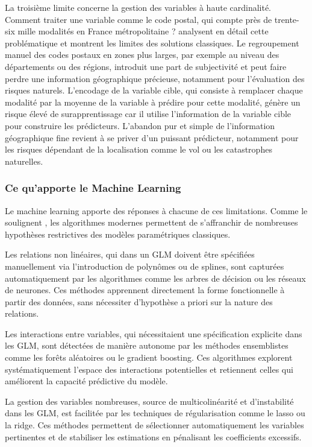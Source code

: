 \documentclass[
  french,
]{book}
\theoremstyle{definition}
\theoremstyle{definition}
\theoremstyle{definition}
\theoremstyle{definition}
\theoremstyle{remark}
\begin{document}
La troisième limite concerne la gestion des variables à haute cardinalité. Comment traiter une variable comme le code postal, qui compte près de trente-six mille modalités en France métropolitaine ? \citet{avanzi2024machine} analysent en détail cette problématique et montrent les limites des solutions classiques. Le regroupement manuel des codes postaux en zones plus larges, par exemple au niveau des départements ou des régions, introduit une part de subjectivité et peut faire perdre une information géographique précieuse, notamment pour l'évaluation des risques naturels. L'encodage de la variable cible, qui consiste à remplacer chaque modalité par la moyenne de la variable à prédire pour cette modalité, génère un risque élevé de surapprentissage car il utilise l'information de la variable cible pour construire les prédicteurs. L'abandon pur et simple de l'information géographique fine revient à se priver d'un puissant prédicteur, notamment pour les risques dépendant de la localisation comme le vol ou les catastrophes naturelles.

\subsubsection{Ce qu'apporte le Machine Learning}

Le machine learning apporte des réponses à chacune de ces limitations. Comme le soulignent \citet{frees2016predictive}, les algorithmes modernes permettent de s'affranchir de nombreuses hypothèses restrictives des modèles paramétriques classiques.

Les relations non linéaires, qui dans un GLM doivent être spécifiées manuellement via l'introduction de polynômes ou de splines, sont capturées automatiquement par les algorithmes comme les arbres de décision ou les réseaux de neurones. Ces méthodes apprennent directement la forme fonctionnelle à partir des données, sans nécessiter d'hypothèse a priori sur la nature des relations.

Les interactions entre variables, qui nécessitaient une spécification explicite dans les GLM, sont détectées de manière autonome par les méthodes ensemblistes comme les forêts aléatoires ou le gradient boosting. Ces algorithmes explorent systématiquement l'espace des interactions potentielles et retiennent celles qui améliorent la capacité prédictive du modèle.

La gestion des variables nombreuses, source de multicolinéarité et d'instabilité dans les GLM, est facilitée par les techniques de régularisation comme le lasso ou la ridge. Ces méthodes permettent de sélectionner automatiquement les variables pertinentes et de stabiliser les estimations en pénalisant les coefficients excessifs.
\end{document}
